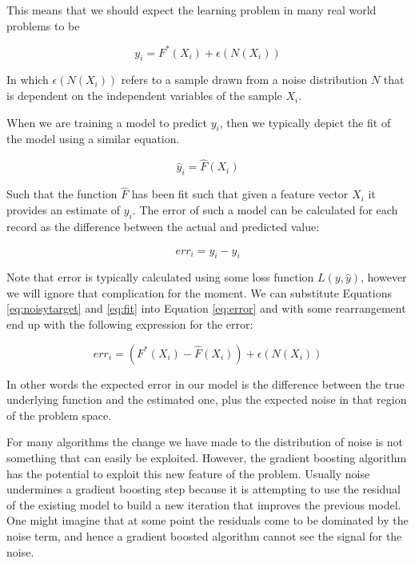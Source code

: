 \documentclass[12pt,a4paper]{article}
\begin{document}
This means that we should expect the learning problem in many real world problems to be

\begin{equation}
y_i = F^*(X_i) + \epsilon(N(X_i))
\label{eq:noisytarget}
\end{equation}

In which $\epsilon(N(X_i))$ refers to a sample drawn from a noise distribution $N$ that is
dependent on the independent variables of the sample $X_i$.

When we are training a model to predict $y_i$, then we typically depict the fit of the model
using a similar equation.

\begin{equation}
\hat{y}_i = \hat{F}(X_i)
\label{eq:fit}
\end{equation}

Such that the function $\hat{F}$ has been fit such that given a feature vector $X_i$ it provides an estimate of $y_i$.
The error of such a model can be calculated for each record as the difference between the actual and predicted value:

\begin{equation}
err_i = y_i - \hat{y}_i
\label{eq:error}
\end{equation}

Note that error is typically calculated using some loss function $L(y,\hat{y})$, however we will ignore that complication for the moment.
We can substitute Equations \ref{eq:noisytarget} and \ref{eq:fit} into Equation \ref{eq:error} and with some rearrangement end up
with the following expression for the error:

\begin{equation}
err_i = ( F^*(X_i) - \hat{F}(X_i) )  + \epsilon(N(X_i))
\label{eq:noisyerror}
\end{equation}

In other words the expected error in our model is the difference between the true underlying function and the estimated one,
plus the expected noise in that region of the problem space.

For many algorithms the change we have made to the distribution of noise is not something that can easily be exploited.
However, the gradient boosting algorithm has the potential to exploit this new feature of the problem. Usually noise undermines
a gradient boosting step because it is attempting to use the residual of the existing model to build a new iteration that
improves the previous model. One might imagine that at some point the residuals come to be dominated by the noise term, and hence a
gradient boosted algorithm cannot see the signal for the noise.
\end{document}
